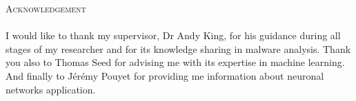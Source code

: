 \textsc{\LARGE Acknowledgement}\\[0.5cm]

\paragraph{}

I would like to thank my supervisor, Dr Andy King, for his guidance during all stages of 
my researcher and for its knowledge sharing in malware analysis.
Thank you also to Thomas Seed for advising me with its expertise in machine learning.
And finally to Jérémy Pouyet for providing me information about neuronal networks 
application. 

\newpage